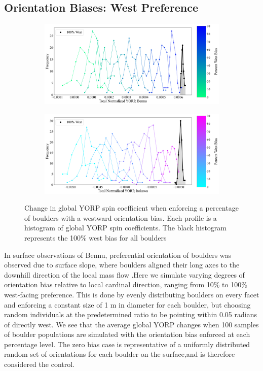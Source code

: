 \subsection{Orientation Biases: West Preference}
\begin{figure}[t!]
    \centering
    \begin{subfigure}{0.49\textwidth}
        \centering
        \includegraphics[width=\textwidth]{fig/bennu_orient_samesize_recreate.png}
    \end{subfigure}
    \hfill
    \begin{subfigure}{0.49\textwidth}
        \centering
        \includegraphics[width=\textwidth]{fig/itokawa_orient_samesize_recreate.png}
    \end{subfigure}
    \caption{Change in global YORP spin coefficient when enforcing a percentage of boulders with a westward orientation bias. Each profile is a histogram of global YORP spin coefficients. The black histogram represents the 100\% west bias for all boulders}
    \label{fig:orient_bias}
\end{figure}

In surface observations of Bennu, preferential orientation of boulders was observed due to surface slope, where boulders aligned their long axes to the downhill direction of the local mass flow \citep{Tang2023}.Here we simulate varying degrees of orientation bias relative to local cardinal direction, ranging from 10\% to 100\% west-facing preference. This is done by evenly distributing boulders on every facet and enforcing a constant size of 1 m in diameter for each boulder, but choosing random individuals at the predetermined ratio to be pointing within 0.05 radians of directly west. We see that the average global YORP changes when 100 samples of boulder populations are simulated with the orientation bias enforced at each percentage level. The zero bias case is representative of a uniformly distributed random set of orientations for each boulder on the surface,and is therefore considered the control.

